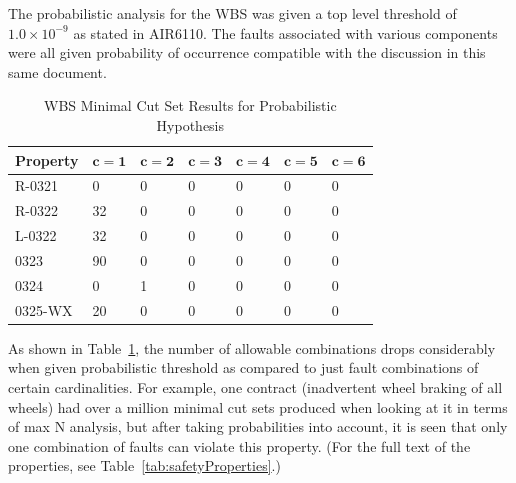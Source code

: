 The probabilistic analysis for the WBS was given a top level threshold of $1.0 \times 10^{-9}$ as stated in AIR6110. The faults associated with various components were all given probability of occurrence compatible with the discussion in this same document. 

\begin{center}
\begin{table}[htbp]
    \begin{tabular}{ | l | l | l | l | l | l | l | }
    \hline
    \textbf{Property} & $\bm{c = 1}$ & $\bm{c = 2}$ & $\bm{c = 3}$ & $\bm{c = 4}$ 
		& $\bm{c = 5}$ & $\bm{c = 6}$   \\ \hline \hline
    R-0321 & 0 & 0 & 0 & 0 & 0 & 0  \\ \hline
    R-0322 & 32 & 0 & 0 &0 &0 &0  \\ \hline
    L-0322 & 32 & 0 & 0 & 0 & 0 & 0   \\ \hline
    0323 & 90 & 0 & 0 & 0 & 0 & 0   \\ \hline
    0324 & 0 & 1 & 0 & 0 & 0 & 0  \\ \hline
    0325-WX & 20 & 0 & 0 &0 &0 & 0   \\ \hline
    \end{tabular}
    \caption{WBS Minimal Cut Set Results for Probabilistic Hypothesis}
    \label{tab:wbs_prob_results}
\end{table}
\end{center}

As shown in Table~\ref{tab:wbs_prob_results}, the number of allowable combinations drops considerably when given probabilistic threshold as compared to just fault combinations of certain cardinalities. For example, one contract (inadvertent wheel braking of all wheels) had over a million minimal cut sets produced when looking at it in terms of max N analysis, but after taking probabilities into account, it is seen that only one combination of faults can violate this property. (For the full text of the properties, see Table~\ref{tab:safetyProperties}.)

